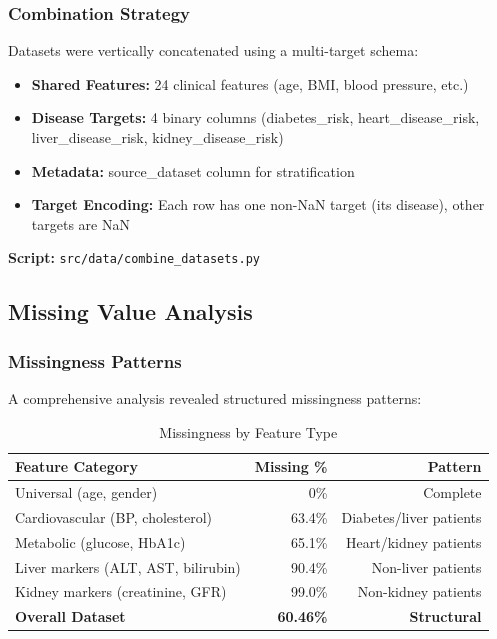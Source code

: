 \documentclass[12pt,a4paper]{article}
\begin{document}
\subsubsection{Combination Strategy}
Datasets were vertically concatenated using a multi-target schema:

\begin{itemize}
    \item \textbf{Shared Features:} 24 clinical features (age, BMI, blood pressure, etc.)
    \item \textbf{Disease Targets:} 4 binary columns (diabetes\_risk, heart\_disease\_risk, liver\_disease\_risk, kidney\_disease\_risk)
    \item \textbf{Metadata:} source\_dataset column for stratification
    \item \textbf{Target Encoding:} Each row has one non-NaN target (its disease), other targets are NaN
\end{itemize}

\textbf{Script:} \texttt{src/data/combine\_datasets.py}

\subsection{Missing Value Analysis}

\subsubsection{Missingness Patterns}
A comprehensive analysis revealed structured missingness patterns:

\begin{table}[H]
\centering
\caption{Missingness by Feature Type}
\begin{tabular}{lrr}
\toprule
\textbf{Feature Category} & \textbf{Missing \%} & \textbf{Pattern} \\
\midrule
Universal (age, gender) & 0\% & Complete \\
Cardiovascular (BP, cholesterol) & 63.4\% & Diabetes/liver patients \\
Metabolic (glucose, HbA1c) & 65.1\% & Heart/kidney patients \\
Liver markers (ALT, AST, bilirubin) & 90.4\% & Non-liver patients \\
Kidney markers (creatinine, GFR) & 99.0\% & Non-kidney patients \\
\midrule
\textbf{Overall Dataset} & \textbf{60.46\%} & \textbf{Structural} \\
\bottomrule
\end{tabular}
\end{table}
\end{document}
